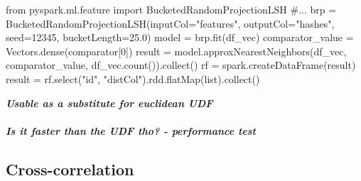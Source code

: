 \begin{pythonCode}[frame=single,label={lst:brp},caption={bucketed random projection},captionpos=b]
from pyspark.ml.feature import BucketedRandomProjectionLSH
#...
brp = BucketedRandomProjectionLSH(inputCol="features", outputCol="hashes", seed=12345, bucketLength=25.0)
model = brp.fit(df_vec)
comparator_value = Vectors.dense(comparator[0])
result = model.approxNearestNeighbors(df_vec, comparator_value, df_vec.count()).collect()
rf = spark.createDataFrame(result)
result = rf.select("id", "distCol").rdd.flatMap(list).collect()
\end{pythonCode}

\noindent\textit{\textbf{Usable as a substitute for euclidean UDF\\}}
\ \\
\noindent\textit{\textbf{Is it faster than the UDF tho? - performance test\\}}

\subsection{Cross-correlation}

